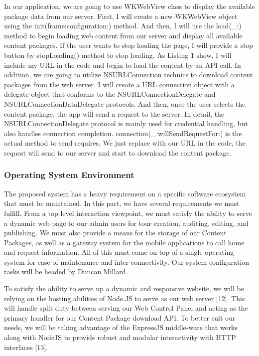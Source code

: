 \documentclass[letterpaper, 10pt,titlepage]{article}
\begin{document}
In our application, we are going to use WKWebView class to display the available package data from our server. First, I will create a new WKWebView object using the init(frame:configuration:) method. And then, I will use the load(\_:) method to begin loading web content from our server and display all available content packages. If the user wants to stop loading the page, I will provide a stop button by stopLoading() method to stop loading. As Listing 1 show, I will include my URL in the code and begin to load the content by an API call. In addition, we are going to utilize NSURLConnection technics to download content packages from the web server. I will create a URL connection object with a delegate object that conforms to the NSURLConnectionDelegate and NSURLConnectionDataDelegate protocols. And then, once the user selects the content package, the app will send a request to the server. In detail, the NSURLConnectionDelegate protocol is mainly used for credential handling, but also handles connection completion. connection(\_:willSendRequestFor:) is the actual method to send requires. We just replace with our URL in the code, the request will send to our server and start to download the content package.

\subsubsection{Operating System Environment}

The proposed system has a heavy requirement on a specific software ecosystem that must be maintained. In this part, we have several requirements we must fulfill. From a top level interaction viewpoint, we must satisfy the ability to serve a dynamic web page to our admin users for tour creation, auditing, editing, and publishing. We must also provide a means for the storage of our Content Packages, as well as a gateway system for the mobile applications to call home and request information. All of this must come on top of a single operating system for ease of maintenance and inter-connectivity. Our system configuration tasks will be headed by Duncan Millard.

To satisfy the ability to serve up a dynamic and responsive website, we will be relying on the hosting abilities of Node.JS to serve as our web server [12]. This will handle split duty between serving our Web Control Panel and acting as the primary handler for our Content Package download API. To better suit our needs, we will be taking advantage of the ExpressJS middle-ware that works along with NodeJS to provide robust and modular interactivity with HTTP interfaces [13].
\end{document}
